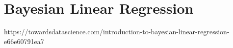 
\chapter{Bayesian Linear Regression}
\label{chap:Bayesian Linear Regression}


https://towardsdatascience.com/introduction-to-bayesian-linear-regression-e66e60791ea7



